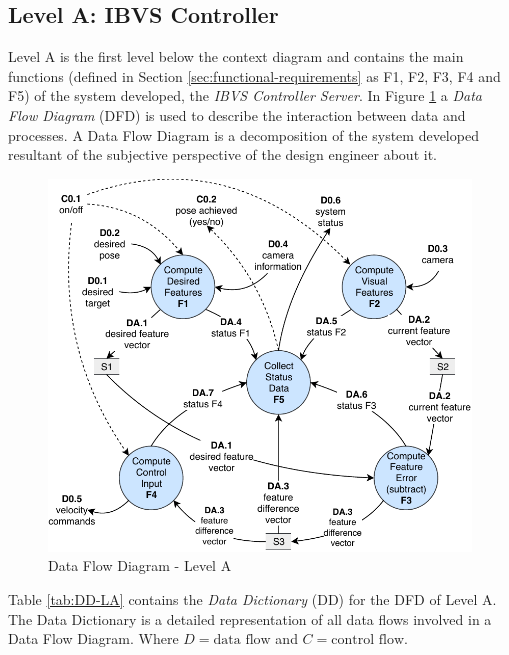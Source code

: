 \subsection{Level A: IBVS Controller}
\label{sec:level-A}

Level A is the first level below the context diagram and contains the main functions (defined in Section \ref{sec:functional-requirements} as F1, F2, F3, F4 and F5) of the system developed, the \textit{IBVS Controller Server}. In Figure \ref{fig:sa_diag_02} a \emph{Data Flow Diagram} (DFD) is used to describe the interaction between data and processes. A Data Flow Diagram \cite{Janschek2011} is a decomposition of the system developed resultant of the subjective perspective of the design engineer about it.


\begin{figure}[!htb]
	\caption{Data Flow Diagram - Level A}
	\label{fig:sa_diag_02}
	\centering
	\includegraphics[width=\textwidth]{content/chapter_03/images/sa_diagram_02.pdf}
\end{figure}

\pagebreak

Table \ref{tab:DD-LA} contains the \emph{Data Dictionary} (DD) for the DFD of Level A. The Data Dictionary \cite{Janschek2011} is a detailed representation of all data flows involved in a Data Flow Diagram. Where $D = \text{data flow}$ and $C = \text{control flow}$.

